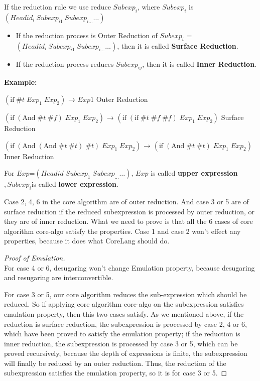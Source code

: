 If the reduction rule we use reduce $Subexp_{i}$, where $Subexp_{i}$ is $(Headid_{i}~Subexp_{i1}~Subexp_{i\ldots} \ldots)$
\begin{itemize}
	\item If the reduction process is Outer Reduction of $Subexp_{i}$ = $(Headid_{i}~Subexp_{i1}~Subexp_{i\ldots} \ldots)$, then it is called {\bfseries Surface Reduction}.
	\item If the reduction process reduces $Subexp_{ij}$, then it is called {\bfseries Inner Reduction}.
\end{itemize}

{\bfseries Example:}

$(\mbox{if}\; \#t\; Exp_{1}\; Exp_{2})$ → $Exp1$ \hfill Outer Reduction

$(\mbox{if}\; (\mbox{And}\; \#t\; \#f)\; Exp_{1}\; Exp_{2})$ → $(\mbox{if}\; (\mbox{if}\; \#t\; \#f\; \#f)\; Exp_{1}\; Exp_{2})$ \hfill Surface Reduction

$(\mbox{if}\; (\mbox{And}\; (\mbox{And}\; \#t\; \#t)\; \#t) \; Exp_{1}\; Exp_{2})$ → $(\mbox{if}\; (\mbox{And}\; \#t\; \#t)\; Exp_{1}\; Exp_{2})$ \hfill Inner Reduction

\begin{Def}
For $Exp$=$(Headid\;Subexp_{1}\;Subexp_{\ldots} \ldots)$, $Exp$ is called {\bfseries upper expression}$,Subexp_{i}$is called {\bfseries lower expression}.
\end{Def}

Case 2, 4, 6 in the core algorithm are of outer reduction. And case 3 or 5 are of surface reduction if the reduced subexpression is processed by outer reduction, or they are of inner reduction.
What we need to prove is that all the 6 cases of core algorithm core-algo satisfy the properties. Case 1 and case 2 won't effect any properties, because it does what CoreLang should do.

\begin{proof}[Proof of Emulation]
\hfill\\
For case 4 or 6, desugaring won't change Emulation property, because desugaring and resugaring are interconvertible.

For case 3 or 5, our core algorithm reduces the sub-expression which should be reduced. So if applying core algorithm core-algo on the subexpression satisfies emulation property, then this two cases satisfy. As we mentioned above, if the reduction is surface reduction, the subexpression is processed by case 2, 4 or 6, which have been proved to satisfy the emulation property; if the reduction is inner reduction, the subexpression is processed by case 3 or 5, which can be proved recursively, because the depth of expressions is finite, the subexpression will finally be reduced by an outer reduction. Thus, the reduction of the subexpression satisfies the emulation property, so it is for case 3 or 5.
\end{proof}

